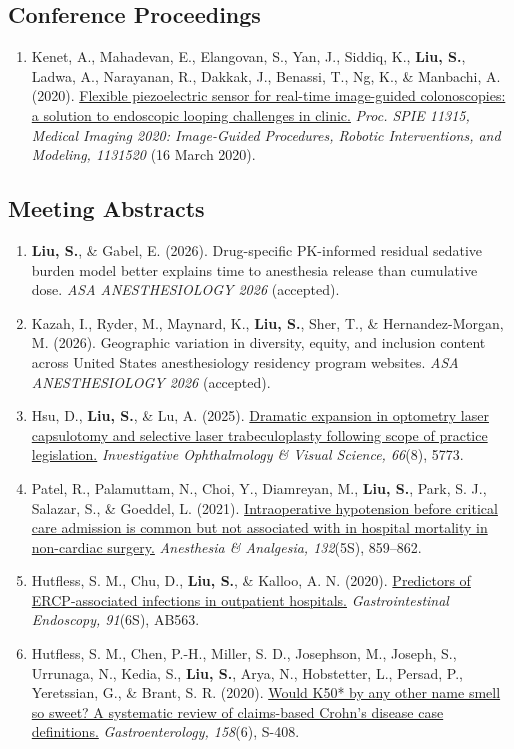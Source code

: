 \documentclass[10pt,letterpaper]{article}
\newcommand{\cvsubsection}[1]{%
  \Needspace{4\baselineskip}%
  \subsection*{#1}%
}
\newcommand{\publication}[2][]{%
  \Needspace{2\baselineskip}%
  \item[#1] {\interlinepenalty=10000 #2\par}%
}
\begin{document}
\cvsubsection{Conference Proceedings}

\begin{enumerate}[leftmargin=2.7em,labelsep=0.6em]

\publication[C-1]{Kenet, A., Mahadevan, E., Elangovan, S., Yan, J., Siddiq, K., \textbf{Liu, S.}, Ladwa, A., Narayanan, R., Dakkak, J., Benassi, T., Ng, K., \& Manbachi, A. (2020). \href{https://doi.org/10.1117/12.2548873}{Flexible piezoelectric sensor for real-time image-guided colonoscopies: a solution to endoscopic looping challenges in clinic.} \emph{Proc. SPIE 11315, Medical Imaging 2020: Image-Guided Procedures, Robotic Interventions, and Modeling, 1131520} (16 March 2020).}
\end{enumerate}

\cvsubsection{Meeting Abstracts}

\begin{enumerate}[leftmargin=2.7em,labelsep=0.6em]

\publication[A-6]{\textbf{Liu, S.}, \& Gabel, E. (2026). Drug-specific PK-informed residual sedative burden model better explains time to anesthesia release than cumulative dose. \emph{ASA ANESTHESIOLOGY 2026} (accepted).}
\publication[A-5]{Kazah, I., Ryder, M., Maynard, K., \textbf{Liu, S.}, Sher, T., \& Hernandez-Morgan, M. (2026). Geographic variation in diversity, equity, and inclusion content across United States anesthesiology residency program websites. \emph{ASA ANESTHESIOLOGY 2026} (accepted).}
\publication[A-4]{Hsu, D., \textbf{Liu, S.}, \& Lu, A. (2025). \href{https://iovs.arvojournals.org/article.aspx?articleid=2808445}{Dramatic expansion in optometry laser capsulotomy and selective laser trabeculoplasty following scope of practice legislation.} \emph{Investigative Ophthalmology \& Visual Science, 66}(8), 5773.}
\publication[A-3]{Patel, R., Palamuttam, N., Choi, Y., Diamreyan, M., \textbf{Liu, S.}, Park, S. J., Salazar, S., \& Goeddel, L. (2021). \href{https://doi.org/10.1213/01.ane.0000803544.47940.c7}{Intraoperative hypotension before critical care admission is common but not associated with in hospital mortality in non-cardiac surgery.} \emph{Anesthesia \& Analgesia, 132}(5S), 859--862.}
\publication[A-2]{Hutfless, S. M., Chu, D., \textbf{Liu, S.}, \& Kalloo, A. N. (2020). \href{https://doi.org/10.1016/j.gie.2020.03.3314}{Predictors of ERCP-associated infections in outpatient hospitals.} \emph{Gastrointestinal Endoscopy, 91}(6S), AB563.}
\publication[A-1]{Hutfless, S. M., Chen, P.-H., Miller, S. D., Josephson, M., Joseph, S., Urrunaga, N., Kedia, S., \textbf{Liu, S.}, Arya, N., Hobstetter, L., Persad, P., Yeretssian, G., \& Brant, S. R. (2020). \href{https://doi.org/10.1016/s0016-5085(20)31712-1}{Would K50* by any other name smell so sweet? A systematic review of claims-based Crohn's disease case definitions.} \emph{Gastroenterology, 158}(6), S-408.}
\end{enumerate}
\end{document}
